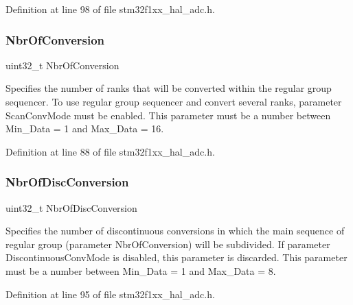 Definition at line 98 of file stm32f1xx\+\_\+hal\+\_\+adc.\+h.

\mbox{\label{struct_a_d_c___init_type_def_acc137bdcf502c586925ad8e99628b03f}} 
\subsubsection{\texorpdfstring{Nbr\+Of\+Conversion}{NbrOfConversion}}
{\footnotesize\ttfamily uint32\+\_\+t Nbr\+Of\+Conversion}

Specifies the number of ranks that will be converted within the regular group sequencer. To use regular group sequencer and convert several ranks, parameter \textquotesingle{}Scan\+Conv\+Mode\textquotesingle{} must be enabled. This parameter must be a number between Min\+\_\+\+Data = 1 and Max\+\_\+\+Data = 16. 

Definition at line 88 of file stm32f1xx\+\_\+hal\+\_\+adc.\+h.

\mbox{\label{struct_a_d_c___init_type_def_a32f3fefba15f525dfc9b9d2cd8a5f9df}} 
\subsubsection{\texorpdfstring{Nbr\+Of\+Disc\+Conversion}{NbrOfDiscConversion}}
{\footnotesize\ttfamily uint32\+\_\+t Nbr\+Of\+Disc\+Conversion}

Specifies the number of discontinuous conversions in which the main sequence of regular group (parameter Nbr\+Of\+Conversion) will be subdivided. If parameter \textquotesingle{}Discontinuous\+Conv\+Mode\textquotesingle{} is disabled, this parameter is discarded. This parameter must be a number between Min\+\_\+\+Data = 1 and Max\+\_\+\+Data = 8. 

Definition at line 95 of file stm32f1xx\+\_\+hal\+\_\+adc.\+h.

\mbox{\label{struct_a_d_c___init_type_def_a67902b5cdd3d1aa4af49654409412a08}} 
